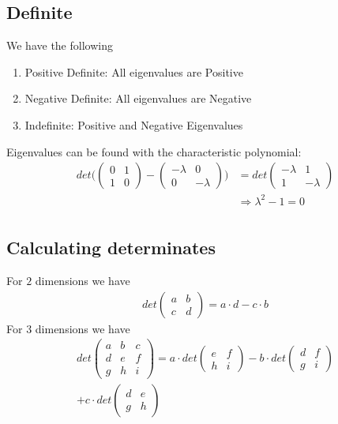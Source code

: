 \documentclass[8pt]{extarticle}
\newcommand{\Ra}{{\Rightarrow}}
\begin{document}
\begin{multicols*}{3}
  \subsection{Definite}
  We have the following
  \begin{enumerate}[label=(\arabic*)]
    \item Positive Definite: All eigenvalues are Positive
    \item Negative Definite: All eigenvalues are Negative
    \item Indefinite: Positive and Negative Eigenvalues
  \end{enumerate}
  Eigenvalues can be found with the characteristic polynomial:
  \begin{align*}
    det \Bigg(
    \begin{pmatrix}
      0 & 1 \\
      1 & 0
    \end{pmatrix}
    -
    \begin{pmatrix}
      -\lambda & 0         \\
      0        & - \lambda
    \end{pmatrix}
    \Bigg)
     & =
    det
    \begin{pmatrix}
      - \lambda & 1         \\
      1         & - \lambda
    \end{pmatrix} \\
     & \Ra \lambda^2 - 1 = 0   \\
  \end{align*}
  \subsection{Calculating determinates}
  For $2$ dimensions we have
  \begin{align*}
    det
    \begin{pmatrix}
      a & b \\
      c & d
    \end{pmatrix}
    = a \cdot d - c \cdot b
  \end{align*}
  For $3$ dimensions we have
  \begin{align*}
    det
    \begin{pmatrix}
      a & b & c \\
      d & e & f \\
      g & h & i
    \end{pmatrix}
    = a \cdot det
    \begin{pmatrix}
      e & f \\
      h & i
    \end{pmatrix}
    - b \cdot det
    \begin{pmatrix}
      d & f \\
      g & i
    \end{pmatrix} \\
    + c \cdot det
    \begin{pmatrix}
      d & e \\
      g & h
    \end{pmatrix}
  \end{align*}

\end{multicols*}
\end{document}
